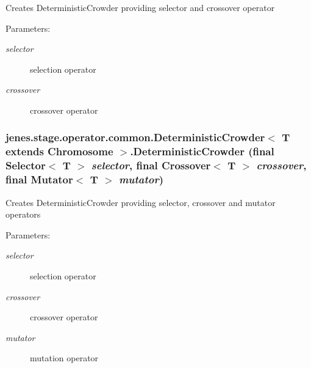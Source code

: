 Creates DeterministicCrowder providing selector and crossover operator

\begin{Desc}
\item[Parameters:]
\begin{description}
\item[{\em selector}]selection operator \item[{\em crossover}]crossover operator \end{description}
\end{Desc}
\hypertarget{classjenes_1_1stage_1_1operator_1_1common_1_1_deterministic_crowder_3_01_t_01extends_01_chromosome_01_4_6359043178a5e4d8922485528acbbcec}{
\subsubsection[DeterministicCrowder]{\setlength{\rightskip}{0pt plus 5cm}jenes.stage.operator.common.DeterministicCrowder$<$ T extends Chromosome $>$.DeterministicCrowder (final Selector$<$ T $>$ {\em selector}, \/  final Crossover$<$ T $>$ {\em crossover}, \/  final Mutator$<$ T $>$ {\em mutator})}}
\label{classjenes_1_1stage_1_1operator_1_1common_1_1_deterministic_crowder_3_01_t_01extends_01_chromosome_01_4_6359043178a5e4d8922485528acbbcec}


Creates DeterministicCrowder providing selector, crossover and mutator operators

\begin{Desc}
\item[Parameters:]
\begin{description}
\item[{\em selector}]selection operator \item[{\em crossover}]crossover operator \item[{\em mutator}]mutation operator \end{description}
\end{Desc}


